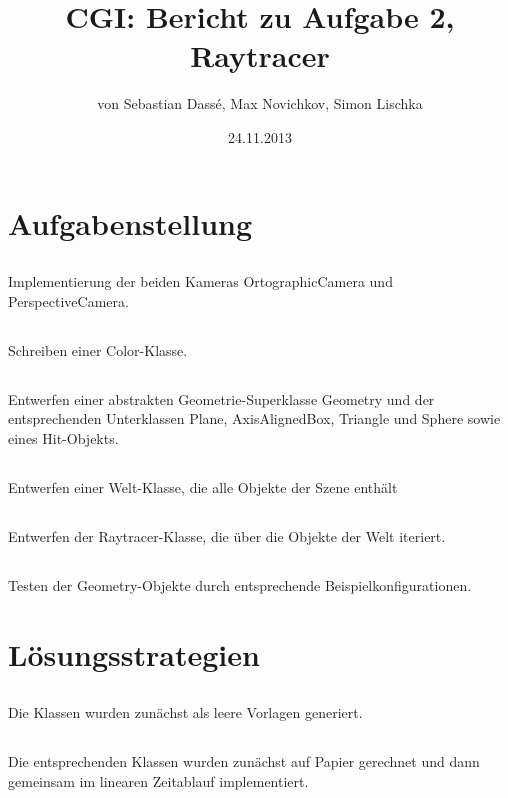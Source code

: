 \documentclass[11pt]{amsart}
\title{CGI: Bericht zu Aufgabe 2, Raytracer}
\author{von Sebastian Dass\'{e}, Max Novichkov, Simon Lischka }
\date{24.11.2013}
\begin{document}
\maketitle

\section{Aufgabenstellung}
\subsection{}
Implementierung der beiden Kameras OrtographicCamera und PerspectiveCamera.

\subsection{}
Schreiben einer Color-Klasse.

\subsection{}
Entwerfen einer abstrakten Geometrie-Superklasse Geometry und der entsprechenden Unterklassen Plane, AxisAlignedBox, Triangle und Sphere sowie eines Hit-Objekts.
\subsection{} 
Entwerfen einer Welt-Klasse, die alle Objekte der Szene enth\"alt
\subsection{} 
Entwerfen der Raytracer-Klasse, die \"uber die Objekte der Welt iteriert.
\subsection{}
Testen der Geometry-Objekte durch entsprechende Beispielkonfigurationen.


\section{L\"osungsstrategien}
\subsection{}
Die Klassen wurden zun\"achst als leere Vorlagen generiert.

\subsection{}
Die entsprechenden Klassen wurden zun\"achst auf Papier
gerechnet und dann gemeinsam im linearen Zeitablauf implementiert.
\end{document}
